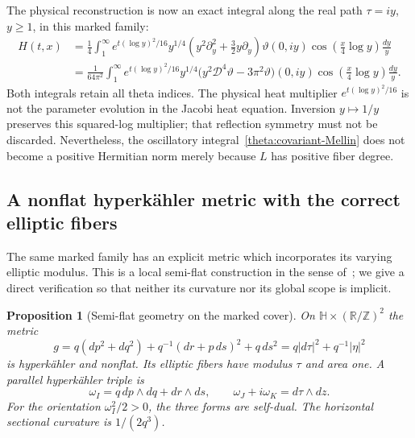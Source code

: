 \documentclass[11pt]{article}
\numberwithin{equation}{section}
\newtheorem{proposition}[theorem]{Proposition}
\theoremstyle{definition}
\theoremstyle{remark}
\begin{document}
The physical reconstruction is now an exact integral along the real
path $\tau=iy$, $y\geq1$, in this marked family:
\begin{align}
 H(t,x)
 &=\frac14\int_1^\infty
    e^{t(\log y)^2/16}y^{1/4}
    \left(y^2\partial_y^2+\frac32y\partial_y\right)\vartheta(0,iy)
       \cos\!\left(\frac x4\log y\right)\frac{dy}{y}
       \label{theta:physical-Mellin}\\
 &=\frac1{64\pi^2}\int_1^\infty
    e^{t(\log y)^2/16}y^{1/4}
    \bigl(y^2\mathcal D^4\vartheta-3\pi^2\vartheta\bigr)(0,iy)
       \cos\!\left(\frac x4\log y\right)\frac{dy}{y}.
       \label{theta:covariant-Mellin}
\end{align}
Both integrals retain all theta indices.  The physical heat multiplier
$e^{t(\log y)^2/16}$ is not the parameter evolution in the Jacobi heat
equation.  Inversion $y\mapsto1/y$ preserves this squared-log multiplier;
that reflection symmetry must not be discarded.  Nevertheless, the
oscillatory integral~\eqref{theta:covariant-Mellin} does not become a
positive Hermitian norm merely because $L$ has positive fiber degree.

\subsection{A nonflat hyperk\"ahler metric with the correct elliptic fibers}
\label{theta:semiflat}

The same marked family has an explicit metric which incorporates its
varying elliptic modulus.  This is a local semi-flat construction in the
sense of~\cite[Section~2]{GrossWilson2000}; we give a direct verification
so that neither its curvature nor its global scope is implicit.

\begin{proposition}[Semi-flat geometry on the marked cover]
\label{theta:semiflat-proposition}
On $\mathbb H\times(\mathbb R/\mathbb Z)^2$ the metric
\begin{equation}
 g=q(dp^2+dq^2)+q^{-1}(dr+p\,ds)^2+q\,ds^2
   =q|d\tau|^2+q^{-1}|\eta|^2
 \label{theta:semiflat-metric}
\end{equation}
is hyperk\"ahler and nonflat.  Its elliptic fibers have modulus $\tau$
and area one.  A parallel hyperk\"ahler triple is
\begin{equation}
 \omega_I=q\,dp\wedge dq+dr\wedge ds,
 \qquad \omega_J+i\omega_K=d\tau\wedge dz.
 \label{theta:hyperkahler-triple}
\end{equation}
For the orientation $\omega_I^2/2>0$, the three forms are self-dual.
The horizontal sectional curvature is $1/(2q^3)$.
\end{proposition}
\end{document}
